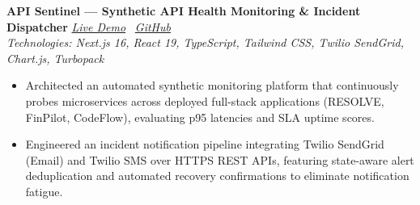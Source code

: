 \documentclass[a4paper,10pt]{article}
\begin{document}
\textbf{API Sentinel — Synthetic API Health Monitoring \& Incident Dispatcher} \hfill \href{https://api-sentinel-psi.vercel.app/dashboard}{\textit{Live Demo}} \textbar \ \href{https://github.com/DikshJaswal/api-sentinel}{\textit{GitHub}}\\
\textit{Technologies: Next.js 16, React 19, TypeScript, Tailwind CSS, Twilio SendGrid, Chart.js, Turbopack}
\begin{itemize}
    \item Architected an automated synthetic monitoring platform that continuously probes microservices across deployed full-stack applications (RESOLVE, FinPilot, CodeFlow), evaluating p95 latencies and SLA uptime scores.
    \item Engineered an incident notification pipeline integrating Twilio SendGrid (Email) and Twilio SMS over HTTPS REST APIs, featuring state-aware alert deduplication and automated recovery confirmations to eliminate notification fatigue.
\end{itemize}
\end{document}
